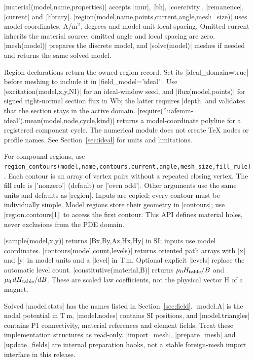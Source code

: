 |material(model,name,properties)| accepts |mur|, |bh|, |coercivity|,
|remanence|, |current| and |library|. |region(model,name,points,current,angle,mesh_size)|
uses model coordinates, A/m$^2$, degrees and model-unit local spacing.
Omitted current inherits the material source; omitted angle and local
spacing are zero. |mesh(model)| prepares the discrete model, and
|solve(model)| meshes if needed and returns the same solved model.

Region declarations return the owned region record. Set its |ideal_domain=true|
before meshing to include it in |field_model='ideal'|. Use
|excitation(model,x,y,NI)| for an ideal-window seed, and
|flux(model,points)| for signed right-normal section flux in Wb; the latter
requires |depth| and validates that the section stays in the active domain.
|require('luafemm-ideal').mean(model,node,cycle,kind)| returns a model-coordinate
polyline for a registered component cycle. The numerical module does not create
TeX nodes or profile names. See Section~\ref{sec:ideal} for units and limitations.

For compound regions, use
\nolinkurl{region_contours(model,name,contours,current,angle,mesh_size,fill_rule)}.
Each contour is an array of vertex pairs without a repeated closing vertex.
The fill rule is |'nonzero'| (default) or |'even odd'|. Other arguments use
the same units and defaults as |region|. Inputs are copied; every contour
must be individually simple. Model regions store their geometry in |contours|;
use |region.contours[1]| to access the first contour.
This API defines material holes, never exclusions from the PDE domain.

|sample(model,x,y)| returns |Bx,By,Az,Hx,Hy| in SI; inputs use model
coordinates. |contours(model,count,levels)| returns oriented path arrays
with |x| and |y| in model units and a |level| in T\,m. Optional explicit
|levels| replace the automatic level count. |constitutive(material,B)|
returns $\mu_0H_{\rm table}/B$ and $\mu_0\,dH_{\rm table}/dB$.
These are scaled law coefficients, not the physical vector H of a magnet.

Solved |model.stats| has the names listed in Section~\ref{sec:field}.
|model.A| is the nodal potential in T\,m, |model.nodes| contains SI positions,
and |model.triangles| contains P1 connectivity, material references and
element fields. Treat these implementation structures as read-only.
|import_mesh|, |prepare_mesh| and |update_fields| are internal preparation hooks, not a
stable foreign-mesh import interface in this release.

